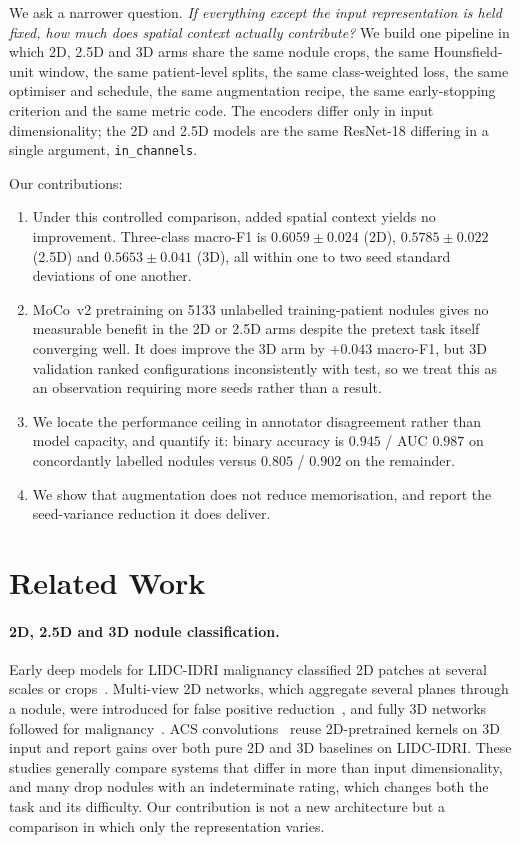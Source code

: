 \documentclass[11pt]{article}
\begin{document}
We ask a narrower question. \emph{If everything except the input representation
is held fixed, how much does spatial context actually contribute?} We build one
pipeline in which 2D, 2.5D and 3D arms share the same nodule crops, the same
Hounsfield-unit window, the same patient-level splits, the same class-weighted
loss, the same optimiser and schedule, the same augmentation recipe, the same
early-stopping criterion and the same metric code. The encoders differ only in
input dimensionality; the 2D and 2.5D models are the same ResNet-18 differing in
a single argument, \texttt{in\_channels}.

Our contributions:

\begin{enumerate}
\item Under this controlled comparison, added spatial context yields no
  improvement. Three-class macro-F1 is $0.6059 \pm 0.024$ (2D),
  $0.5785 \pm 0.022$ (2.5D) and $0.5653 \pm 0.041$ (3D), all within one to two seed
  standard deviations of one another.
\item MoCo~v2 pretraining on 5133 unlabelled training-patient nodules gives no
  measurable benefit in the 2D or 2.5D arms despite the pretext task itself
  converging well. It does improve the 3D arm by $+0.043$ macro-F1, but 3D
  validation ranked configurations inconsistently with test, so we treat this
  as an observation requiring more seeds rather than a result.
\item We locate the performance ceiling in annotator disagreement rather than
  model capacity, and quantify it: binary accuracy is $0.945$ / AUC $0.987$ on
  concordantly labelled nodules versus $0.805$ / $0.902$ on the remainder.
\item We show that augmentation does not reduce memorisation, and report the
  seed-variance reduction it does deliver.
\end{enumerate}

\section{Related Work}

\paragraph{2D, 2.5D and 3D nodule classification.} Early deep models for
LIDC-IDRI malignancy classified 2D patches at several scales or
crops~\citep{shen2015multiscale,shen2017multicrop}. Multi-view 2D networks,
which aggregate several planes through a nodule, were introduced for false
positive reduction~\citep{setio2016multiview}, and fully 3D networks followed
for malignancy~\citep{hussein2017risk,zhu2018deeplung}. ACS
convolutions~\citep{yang2021acs} reuse 2D-pretrained kernels on 3D input and
report gains over both pure 2D and 3D baselines on LIDC-IDRI. These studies
generally compare systems that differ in more than input dimensionality, and
many drop nodules with an indeterminate rating, which changes both the task and
its difficulty. Our contribution is not a new architecture but a comparison in
which only the representation varies.
\end{document}
